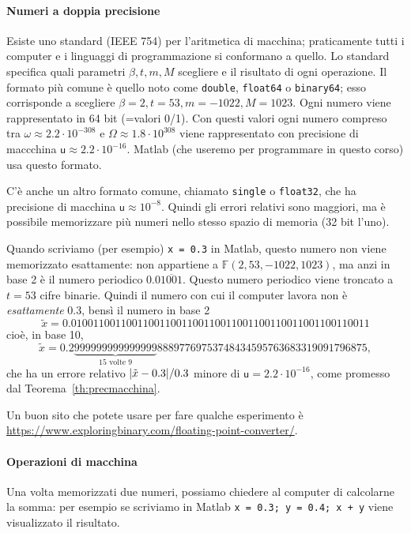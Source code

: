 \documentclass[a4paper]{report}
\DeclarePairedDelimiter{\abs}{\lvert}{\rvert}
\theoremstyle{definiton}
\theoremstyle{remark}
\begin{document}
\paragraph{Numeri a doppia precisione}
Esiste uno standard (IEEE 754) per l'aritmetica di macchina; praticamente tutti i computer e i linguaggi di programmazione si conformano a quello. Lo standard specifica quali parametri $\beta,t,m,M$ scegliere e il risultato di ogni operazione. Il formato più comune è quello noto come \texttt{double}, \texttt{float64} o \texttt{binary64}; esso corrisponde a scegliere $\beta = 2, t=53, m=-1022, M = 1023$. Ogni numero viene rappresentato in 64 bit (=valori 0/1). Con questi valori ogni numero compreso tra $\omega \approx 2.2 \cdot 10^{-308}$ e $\Omega \approx 1.8 \cdot 10^{308}$ viene rappresentato con precisione di maccchina $\mathsf{u} \approx 2.2 \cdot 10^{-16}$. Matlab (che useremo per programmare in questo corso) usa questo formato.

C'è anche un altro formato comune, chiamato \texttt{single} o \texttt{float32}, che ha precisione di macchina $\mathsf{u}\approx 10^{-8}$. Quindi gli errori relativi sono maggiori, ma è possibile memorizzare più numeri nello stesso spazio di memoria (32 bit l'uno).

Quando scriviamo (per esempio) \texttt{x = 0.3} in Matlab, questo numero non viene memorizzato esattamente: non appartiene a $\mathbb{F}(2, 53, -1022, 1023)$, ma anzi in base 2 è il numero periodico $0.0\overline{1001}$. Questo numero periodico viene troncato a $t=53$ cifre binarie. Quindi il numero con cui il computer lavora non è \emph{esattamente} $0.3$, bensì il numero in base 2
\[
\tilde{x} = 0.010011001100110011001100110011001100110011001100110011
\]
cioè, in base 10,
\[
\tilde{x} = 0.2\underbrace{999999999999999}_{\text{15 volte 9}}88897769753748434595763683319091796875,
\]
che ha un errore relativo $\abs{\tilde{x}- 0.3} / 0.3$ minore di $\mathsf{u} = 
2.2 \cdot 10^{-16}$, come promesso dal Teorema~\ref{th:precmacchina}.

Un buon sito che potete usare per fare qualche esperimento è \url{https://www.exploringbinary.com/floating-point-converter/}.

\paragraph{Operazioni di macchina}

Una volta memorizzati due numeri, possiamo chiedere al computer di calcolarne la somma: per esempio se scriviamo in Matlab
\texttt{x = 0.3; y = 0.4; x + y} viene visualizzato il risultato.
\end{document}
